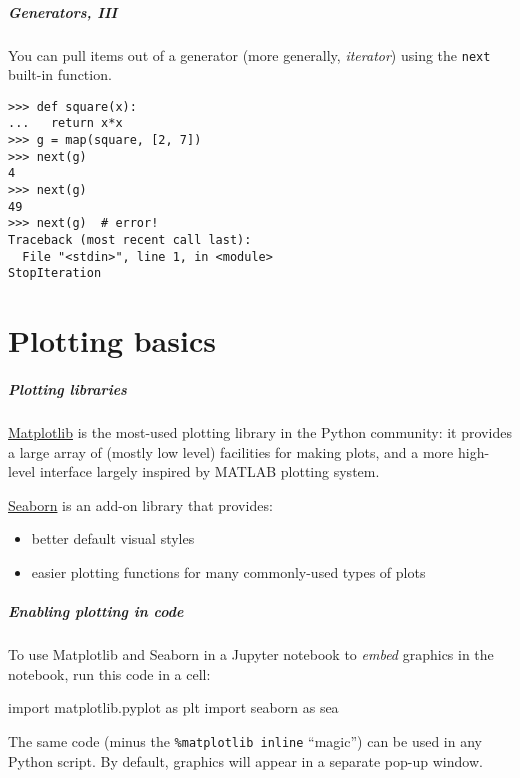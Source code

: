 \documentclass[english,serif,mathserif,xcolor=pdftex,dvipsnames,table]{beamer}
\begin{document}
\begin{frame}[fragile]
  \frametitle{Generators, III}

  You can pull items out of a generator (more generally,
  \emph{iterator}\/) using the \lstinline|next| built-in function.

  \+
\begin{lstlisting}
>>> def square(x):
...   return x*x
>>> g = map(square, [2, 7])
>>> next(g)
4
>>> next(g)
49
>>> next(g)  # error!
Traceback (most recent call last):
  File "<stdin>", line 1, in <module>
StopIteration
\end{lstlisting}
\end{frame}


\part{Plotting basics}
\begin{frame}
  \frametitle{Plotting libraries}

  \href{http://matplotlib.org/gallery.html}{Matplotlib} is the most-used
plotting library in the Python community: it provides a large array of
(mostly low level) facilities for making plots, and a more high-level
interface largely inspired by MATLAB plotting system.

\href{http://seaborn.pydata.org/index.html}{Seaborn} is an add-on
library that provides:

\begin{itemize}
\item
  better default visual styles
\item
  easier plotting functions for many commonly-used types of plots
\end{itemize}

\end{frame}

\begin{frame}[fragile]
  \frametitle{Enabling plotting in code}

  To use Matplotlib and Seaborn in a Jupyter notebook to \emph{embed} graphics
  in the notebook, run this code in a cell:
  \begin{python}

import matplotlib.pyplot as plt
import seaborn as sea
  \end{python}

  \+ The same code (minus the \texttt{\%matplotlib inline} ``magic'') can be
  used in any Python script.  By default, graphics will appear in a separate
  pop-up window.
\end{frame}
\end{document}

